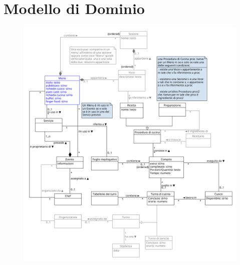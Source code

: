\chapter{Modello di Dominio}

\begin{figure}[h]
  \begin{center}
    \includegraphics[scale = 0.3]{images/Modello di dominio/modello dominio Turni.png}
  \end{center}
\end{figure}

